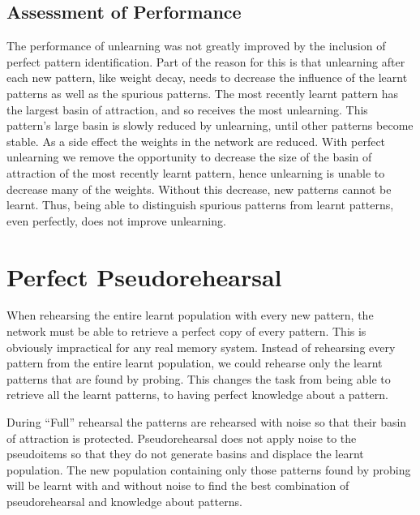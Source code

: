 \subsection{Assessment of Performance}

The performance of unlearning was not greatly improved by the inclusion of perfect pattern identification.  Part of the reason for this is that unlearning after each new pattern, like weight decay, needs to decrease the influence of the learnt patterns as well as the spurious patterns.  The most recently learnt pattern has the largest basin of attraction, and so receives the most unlearning.  This pattern's large basin is slowly reduced by unlearning, until other patterns become stable.  As a side effect the weights in the network are reduced.  With perfect unlearning we remove the opportunity to decrease the size of the basin of attraction of the most recently learnt pattern, hence unlearning is unable to decrease many of the weights.  Without this decrease, new patterns cannot be learnt.  Thus, being able to distinguish spurious patterns from learnt patterns, even perfectly, does not improve unlearning. 


\section{Perfect Pseudorehearsal}

When rehearsing the entire learnt population with every new pattern, the network must be able to retrieve a perfect copy of every pattern.  This is obviously impractical for any real memory system.  Instead of rehearsing every pattern from the entire learnt population, we could rehearse only the learnt patterns that are found by probing.  This changes the task from being able to retrieve all the learnt patterns, to having perfect knowledge about a pattern.  

During ``Full'' rehearsal the patterns are rehearsed with noise so that their basin of attraction is protected.  Pseudorehearsal does not apply noise to the pseudoitems so that they do not generate basins and displace the learnt population.  The new population containing only those patterns found by probing will be learnt with and without noise to find the best combination of pseudorehearsal and knowledge about patterns.

